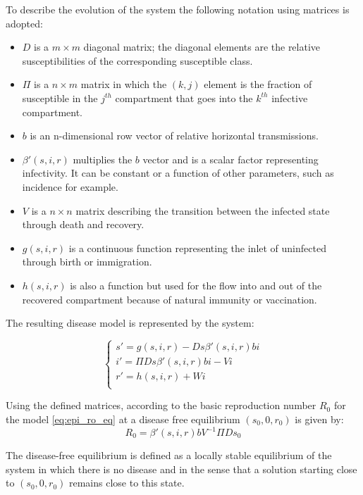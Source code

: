 To describe the evolution of the system the following notation using matrices is adopted: 
\begin{itemize}
	\item $D$ is a $m \times m$ diagonal matrix; the diagonal elements are the relative susceptibilities of the corresponding susceptible class.
	\item $\Pi$ is a $n \times m$ matrix in which the $(k,j)$ element is the fraction of susceptible in the $j^{th}$ compartment that goes into the $k^{th}$ infective compartment.
	\item $b$ is an n-dimensional row vector of relative
	horizontal transmissions.
	\item $\beta'(s, i,r)$ multiplies the $b$ vector and is a scalar factor representing infectivity. It can be constant or a function of other parameters, such as incidence for example. 
	
	\item $V$ is a $n \times n$ matrix describing the transition between the infected state through death and recovery. 
	\item $g(s, i,r)$ is a continuous function representing the inlet of uninfected through birth or immigration. 
	\item $h(s, i, r)$ is also a function but used for the flow into and out of the recovered compartment because of natural immunity or vaccination.
\end{itemize} 

The resulting disease model is represented by the system:

\begin{equation}
	\begin{cases}
		s' = g(s,i,r) - D s \beta'(s,i,r) b i\\
		i' = \Pi D s \beta'(s,i,r) b i - V i\\
		r' = h(s,i,r) + W i \\		
	\end{cases}
	\label{eq:epi_ro_eq}
\end{equation}

Using the defined matrices, according to \cite{arino2007} the basic reproduction number $R_0$ for the model \eqref{eq:epi_ro_eq} at a disease free equilibrium $(s_0, 0, r_0)$ is given by:
\begin{equation}
R_0 = \beta'(s,i,r) b V^{-1} \Pi D s_0
\label{eq:R_0_eqn}
\end{equation}

The disease-free equilibrium is defined as a locally stable equilibrium of the system in which there is no disease and in the sense that a solution starting close to $(s_0, 0, r_0)$ remains close to this state. 

